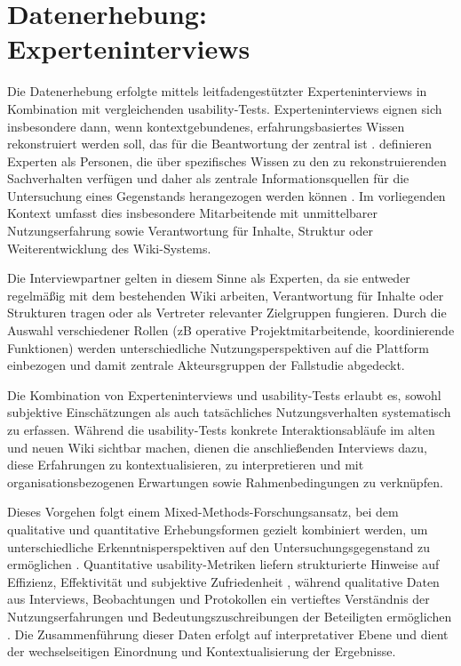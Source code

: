 \section{Datenerhebung: Experteninterviews}
\label{sec:04_interviews-data-collection}

Die Datenerhebung erfolgte mittels leitfadengestützter Experteninterviews in Kombination mit vergleichenden \Gls{usability}-Tests. Experteninterviews eignen sich insbesondere dann, wenn kontextgebundenes, erfahrungsbasiertes Wissen rekonstruiert werden soll, das für die Beantwortung der  zentral ist \cite{405:KvaleBrinkmann2015,420:GlaeserLaudel2010}. \citeauthor{420:GlaeserLaudel2010} definieren Experten als Personen, die über spezifisches Wissen zu den zu rekonstruierenden Sachverhalten verfügen und daher als zentrale Informationsquellen für die Untersuchung eines Gegenstands herangezogen werden können \cite{420:GlaeserLaudel2010}. Im vorliegenden Kontext umfasst dies insbesondere Mitarbeitende mit unmittelbarer Nutzungserfahrung sowie Verantwortung für Inhalte, Struktur oder Weiterentwicklung des Wiki-Systems.

Die Interviewpartner gelten in diesem Sinne als Experten, da sie entweder regelmäßig mit dem bestehenden Wiki arbeiten, Verantwortung für Inhalte oder Strukturen tragen oder als Vertreter relevanter Zielgruppen fungieren. Durch die Auswahl verschiedener Rollen (\acrshort{zB} operative Projektmitarbeitende, koordinierende Funktionen) werden unterschiedliche Nutzungsperspektiven auf die Plattform einbezogen und damit zentrale Akteursgruppen der Fallstudie abgedeckt.

\newpage

Die Kombination von Experteninterviews und \Gls{usability}-Tests erlaubt es, sowohl subjektive Einschätzungen als auch tatsächliches Nutzungsverhalten systematisch zu erfassen. Während die \Gls{usability}-Tests konkrete Interaktionsabläufe im alten und neuen Wiki sichtbar machen, dienen die anschließenden Interviews dazu, diese Erfahrungen zu kontextualisieren, zu interpretieren und mit organisationsbezogenen Erwartungen sowie Rahmenbedingungen zu verknüpfen.

Dieses Vorgehen folgt einem Mixed-Methods-Forschungsansatz, bei dem qualitative und quantitative Erhebungsformen gezielt kombiniert werden, um unterschiedliche Erkenntnisperspektiven auf den Untersuchungsgegenstand zu ermöglichen \cite{404:Yin2018}. Quantitative \Gls{usability}-Metriken liefern strukturierte Hinweise auf Effizienz, Effektivität und subjektive Zufriedenheit \cite{501:ISO9241-11}, während qualitative Daten aus Interviews, Beobachtungen und Protokollen ein vertieftes Verständnis der Nutzungserfahrungen und Bedeutungszuschreibungen der Beteiligten ermöglichen \cite{405:KvaleBrinkmann2015}. Die Zusammenführung dieser Daten erfolgt auf interpretativer Ebene und dient der wechselseitigen Einordnung und Kontextualisierung der Ergebnisse.


